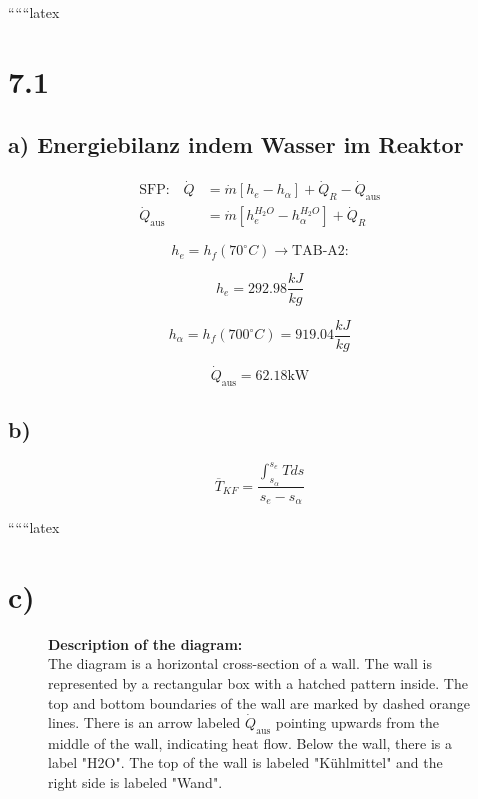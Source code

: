 
``````latex


\section*{7.1}

\subsection*{a) Energiebilanz indem Wasser im Reaktor}

\begin{align*}
\text{SFP:} \quad \dot{Q} &= \dot{m} \left[ h_e - h_\alpha \right] + \dot{Q}_R - \dot{Q}_{\text{aus}} \\
\dot{Q}_{\text{aus}} &= \dot{m} \left[ h_e^{H_2O} - h_\alpha^{H_2O} \right] + \dot{Q}_R
\end{align*}

\[
h_e = h_f(70^\circ C) \rightarrow \text{TAB-A2:}
\]

\[
h_e = 292.98 \frac{kJ}{kg}
\]

\[
h_\alpha = h_f(700^\circ C) = 919.04 \frac{kJ}{kg}
\]

\[
\dot{Q}_{\text{aus}} = 62.18 \text{kW}
\]

\subsection*{b)}

\[
\overline{T}_{KF} = \frac{\int_{s_\alpha}^{s_e} T ds}{s_e - s_\alpha}
\]


``````latex


\section*{c)}

\begin{figure}[h!]
\centering
\begin{minipage}{0.8\textwidth}
\centering
\textbf{Description of the diagram:} \\
The diagram is a horizontal cross-section of a wall. The wall is represented by a rectangular box with a hatched pattern inside. The top and bottom boundaries of the wall are marked by dashed orange lines. There is an arrow labeled $\dot{Q}_{\text{aus}}$ pointing upwards from the middle of the wall, indicating heat flow. Below the wall, there is a label "H2O". The top of the wall is labeled "Kühlmittel" and the right side is labeled "Wand".
\end{minipage}
\end{figure}

